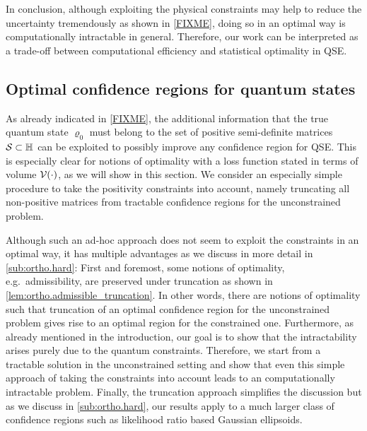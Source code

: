 In conclusion, although exploiting the physical constraints may help to reduce the uncertainty tremendously as shown in \cref{FIXME}, doing so in an optimal way is computationally intractable in general.
Therefore, our work can be interpreted as a trade-off between computational efficiency and statistical optimality in QSE.

\subsection{Optimal confidence regions for quantum states}
\label{sub:ortho.optimal}

As already indicated in \cref{FIXME}, the additional information that the true quantum state $\varrho_0$ must belong to the set of positive semi-definite matrices $\mathcal{S} \subset \mathbb{H}$ can be exploited to possibly improve any confidence region for QSE.
This is especially clear for notions of optimality with a loss function stated in terms of volume $\mathcal{V}(\cdot)$, as we will show in this section.
We consider an especially simple procedure to take the positivity constraints into account, namely truncating all non-positive matrices from tractable confidence regions for the unconstrained problem.

Although such an ad-hoc approach does not seem to exploit the constraints in an optimal way, it has multiple advantages as we discuss in more detail in \cref{sub:ortho.hard}:
First and foremost, some notions of optimality, e.g.\ admissibility, are preserved under truncation as shown in \cref{lem:ortho.admissible_truncation}.
In other words, there are notions of optimality such that truncation of an optimal confidence region for the unconstrained problem gives rise to an optimal region for the constrained one.
Furthermore, as already mentioned in the introduction, our goal is to show that the intractability arises purely due to the quantum constraints.
Therefore, we start from a tractable solution in the unconstrained setting and show that even this simple approach of taking the constraints into account leads to an computationally intractable problem.
Finally, the truncation approach simplifies the discussion but as we discuss in \cref{sub:ortho.hard}, our results apply to a much larger class of confidence regions such as likelihood ratio based Gaussian ellipsoids.\\



